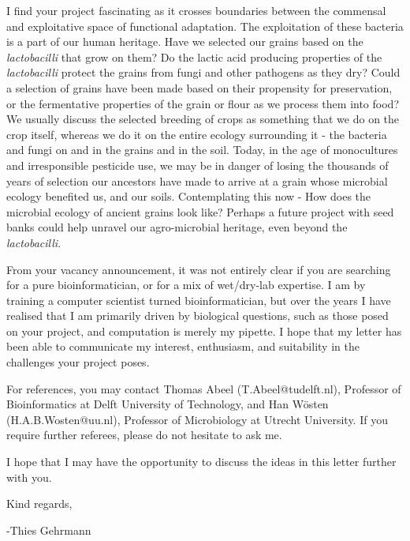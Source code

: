 \documentclass[letterpaper, 10pt]{article} %
\begin{document}
\begin{tcolorbox}[
	blanker,
	width=0.90\textwidth,
	enlarge left by=0.05\textwidth,
	enlarge right by=0.05\textwidth,
	before skip=6pt,
	breakable]
I find your project fascinating as it crosses boundaries between the commensal and exploitative space of functional adaptation. The exploitation of these bacteria is a part of our human heritage. Have we selected our grains based on the \textit{lactobacilli} that grow on them? Do the lactic acid producing properties of the \textit{lactobacilli} protect the grains from fungi and other pathogens as they dry? Could a selection of grains have been made based on their propensity for preservation, or the fermentative properties of the grain or flour as we process them into food? We usually discuss the selected breeding of crops as something that we do on the crop itself, whereas we do it on the entire ecology surrounding it - the bacteria and fungi on and in the grains and in the soil. Today, in the age of monocultures and irresponsible pesticide use, we may be in danger of losing the thousands of years of selection our ancestors have made to arrive at a grain whose microbial ecology benefited us, and our soils. Contemplating this now - How does the microbial ecology of ancient grains look like? Perhaps a future project with seed banks could help unravel our agro-microbial heritage, even beyond the \textit{lactobacilli}.

From your vacancy announcement, it was not entirely clear if you are searching for a pure bioinformatician, or for a mix of wet/dry-lab expertise. I am by training a computer scientist turned bioinformatician, but over the years I have realised that I am primarily driven by biological questions, such as those posed on your project, and computation is merely my pipette. I hope that my letter has been able to communicate my interest, enthusiasm, and suitability in the challenges your project poses.

For references, you may contact
Thomas Abeel (T.Abeel@tudelft.nl), Professor of Bioinformatics at Delft University of Technology, and
Han W\"{o}sten (H.A.B.Wosten@uu.nl), Professor of Microbiology at Utrecht University. If you require further referees, please do not hesitate to ask me.

I hope that I may have the opportunity to discuss the ideas in this letter further with you.

Kind regards,

-Thies Gehrmann


\end{tcolorbox}


\thispagestyle{empty}
\end{document}
